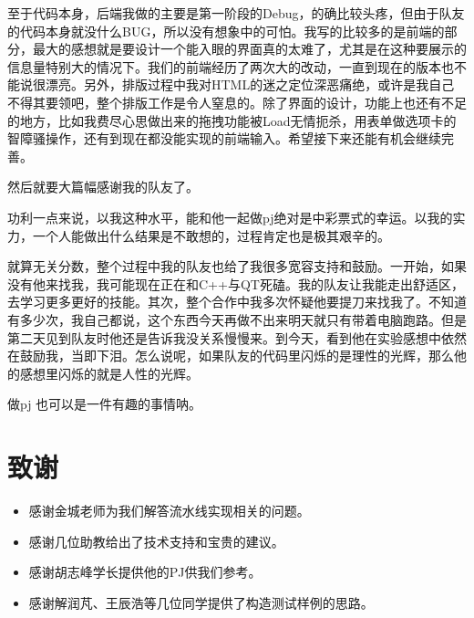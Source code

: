 \documentclass[a4paper,11pt,UTF8]{ctexart}
\begin{document}
\begin{sloppypar}
至于代码本身，后端我做的主要是第一阶段的Debug，的确比较头疼，但由于队友的代码本身就没什么BUG，所以没有想象中的可怕。我写的比较多的是前端的部分，最大的感想就是要设计一个能入眼的界面真的太难了，尤其是在这种要展示的信息量特别大的情况下。我们的前端经历了两次大的改动，一直到现在的版本也不能说很漂亮。另外，排版过程中我对HTML的迷之定位深恶痛绝，或许是我自己不得其要领吧，整个排版工作是令人窒息的。除了界面的设计，功能上也还有不足的地方，比如我费尽心思做出来的拖拽功能被Load无情扼杀，用表单做选项卡的智障骚操作，还有到现在都没能实现的前端输入。希望接下来还能有机会继续完善。

然后就要大篇幅感谢我的队友了。

功利一点来说，以我这种水平，能和他一起做pj绝对是中彩票式的幸运。以我的实力，一个人能做出什么结果是不敢想的，过程肯定也是极其艰辛的。

就算无关分数，整个过程中我的队友也给了我很多宽容支持和鼓励。一开始，如果没有他来找我，我可能现在正在和C++与QT死磕。我的队友让我能走出舒适区，去学习更多更好的技能。其次，整个合作中我多次怀疑他要提刀来找我了。不知道有多少次，我自己都说，这个东西今天再做不出来明天就只有带着电脑跑路。但是第二天见到队友时他还是告诉我没关系慢慢来。到今天，看到他在实验感想中依然在鼓励我，当即下泪。怎么说呢，如果队友的代码里闪烁的是理性的光辉，那么他的感想里闪烁的就是人性的光辉。

做pj 也可以是一件有趣的事情呐。

\clearpage
\section{致谢}

\begin{itemize}
\item 感谢金城老师为我们解答流水线实现相关的问题。
\item 感谢几位助教给出了技术支持和宝贵的建议。
\item 感谢胡志峰学长提供他的PJ供我们参考。
\item 感谢解润芃、王辰浩等几位同学提供了构造测试样例的思路。
\end{itemize}


\end{sloppypar}
\end{document}
